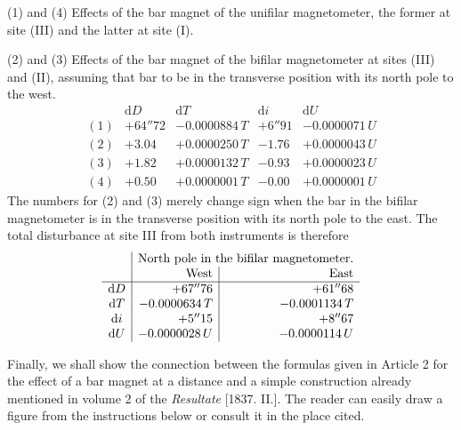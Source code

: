 (1) and (4) Effects of the bar magnet of the unifilar magnetometer, the former at site (III) and the latter at site (I).

(2) and (3) Effects of the bar magnet of the bifilar magnetometer at sites (III) and (II), assuming that bar to be in the transverse position with its north pole to the west.
\[
\begin{array}{c|r|r|r|r}
&\mathrm{d}D&\mathrm{d}T&\mathrm{d}i&\mathrm{d}U\\\hline
(1)&+64''72&-0.0000884\,T&+6''91&-0.0000071\,U\\
(2)&+3.04&+0.0000250\,T&-1.76&+0.0000043\,U\\
(3)&+1.82&+0.0000132\,T&-0.93&+0.0000023\,U\\
(4)&+0.50&+0.0000001\,T&-0.00&+0.0000001\,U
\end{array}
\]
The numbers for (2) and (3) merely change sign when the bar in the bifilar magnetometer is in the transverse position with its north pole to the east. The total disturbance at site III from both instruments is therefore
\[
\begin{array}{c|r|r}
&\multicolumn{2}{c}{\text{North pole in the bifilar magnetometer.}}\\
&\text{West}&\text{East}\\\hline
\mathrm{d}D&+67''76&+61''68\\
\mathrm{d}T&-0.0000634\,T&-0.0001134\,T\\
\mathrm{d}i&+5''15&+8''67\\
\mathrm{d}U&-0.0000028\,U&-0.0000114\,U
\end{array}
\]

Finally, we shall show the connection between the formulas given in Article 2 for the effect of a bar magnet at a distance and a simple construction already mentioned in volume 2 of the \textit{Resultate} [1837. II.]. The reader can easily draw a figure from the instructions below or consult it in the place cited.

